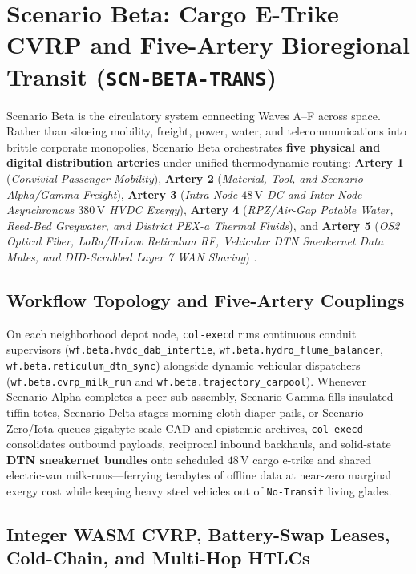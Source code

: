 \section{Scenario Beta: Cargo E-Trike CVRP and Five-Artery Bioregional Transit (\texttt{SCN-BETA-TRANS})}
\label{sec:wave-b-beta}

Scenario Beta is the circulatory system connecting Waves A--F across space. Rather than
siloeing mobility, freight, power, water, and telecommunications into brittle corporate
monopolies, Scenario Beta orchestrates \textbf{five physical and digital distribution arteries}
under unified thermodynamic routing: \textbf{Artery 1} (\textit{Convivial Passenger Mobility}),
\textbf{Artery 2} (\textit{Material, Tool, and Scenario Alpha/Gamma Freight}), \textbf{Artery 3}
(\textit{Intra-Node $48\,\mathrm{V}$ DC and Inter-Node Asynchronous $380\,\mathrm{V}$ HVDC
Exergy}), \textbf{Artery 4} (\textit{RPZ/Air-Gap Potable Water, Reed-Bed Greywater, and District
PEX-a Thermal Fluids}), and \textbf{Artery 5} (\textit{OS2 Optical Fiber, LoRa/HaLow Reticulum
RF, Vehicular DTN Sneakernet Data Mules, and DID-Scrubbed Layer 7 WAN Sharing})
\parencite{fall2003,rekhter2006}.

\subsection{Workflow Topology and Five-Artery Couplings}

On each neighborhood depot node, \texttt{col-execd} runs continuous conduit supervisors
(\texttt{wf.beta.hvdc\_dab\_intertie}, \texttt{wf.beta.hydro\_flume\_balancer},
\texttt{wf.beta.reticulum\_dtn\_sync}) alongside dynamic vehicular dispatchers
(\texttt{wf.beta.cvrp\_milk\_run} and \texttt{wf.beta.trajectory\_carpool}). Whenever
Scenario Alpha completes a peer sub-assembly, Scenario Gamma fills insulated tiffin totes,
Scenario Delta stages morning cloth-diaper pails, or Scenario Zero/Iota queues gigabyte-scale
CAD and epistemic archives, \texttt{col-execd} consolidates outbound payloads, reciprocal
inbound backhauls, and solid-state \textbf{DTN sneakernet bundles} onto scheduled $48\,\mathrm{V}$
cargo e-trike and shared electric-van milk-runs---ferrying terabytes of offline data at near-zero
marginal exergy cost while keeping heavy steel vehicles out of \texttt{No-Transit} living glades.

\subsection{Integer WASM CVRP, Battery-Swap Leases, Cold-Chain, and Multi-Hop HTLCs}


